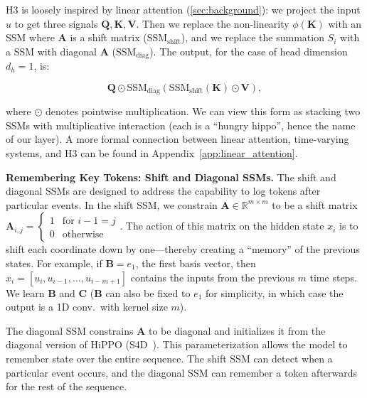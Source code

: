 \textsc{H3} is loosely inspired by linear attention (\ref{sec:background}): we project the input $u$ to get three signals $\mathbf{Q}, \mathbf{K}, \mathbf{V}$.
Then we replace the non-linearity $\phi(\mathbf{K})$ with an SSM where $\mathbf{A}$ is a shift matrix ($\mathrm{SSM}_\mathrm{shift}$), and we replace the summation $S_i$ with a SSM with diagonal $\mathbf{A}$ ($\mathrm{SSM}_\mathrm{diag}$).
The output, for the case of head dimension $d_h = 1$, is:

\begin{equation*}
  \mathbf{Q} \odot \mathrm{SSM}_\mathrm{diag}(\mathrm{SSM}_\mathrm{shift}(\mathbf{K}) \odot \mathbf{V}),
\end{equation*}

where $\odot$ denotes pointwise multiplication. We can view this form as stacking two SSMs with multiplicative interaction (each is a ``hungry hippo'', hence the name of our layer). A more formal connection between linear attention, time-varying systems, and \textsc{H3} can be found in Appendix~\ref{app:linear_attention}.

\textbf{Remembering Key Tokens: Shift and Diagonal SSMs.} The shift and diagonal SSMs are designed to address the capability to log tokens after particular events. In the shift SSM, we constrain $\mathbf{A} \in \mathbb{R}^{m \times m}$ to be a shift matrix $
\mathbf{A}_{i, j} =

\begin{cases}
    1 & \text{for } i - 1 = j\\ 0 & \text{otherwise}
    \end{cases}

$. The action of this matrix on the hidden state $x_i$ is to shift each coordinate down by one---thereby creating a ``memory'' of the previous states. For example, if $\mathbf{B} = e_1$, the first basis vector, then $x_i = [u_i, u_{i-1}, \dots, u_{i-m+1}]$ contains the inputs from the previous $m$ time steps. We learn $\mathbf{B}$ and $\mathbf{C}$ ($\mathbf{B}$ can also be fixed to $e_1$ for simplicity, in which case the output is a 1D conv.\ with kernel size $m$).

The diagonal SSM constrains $\mathbf{A}$ to be diagonal and initializes it from the diagonal version of HiPPO (S4D~\citep{gu2022parameterization}). This parameterization allows the model to remember state over the entire sequence. The shift SSM can detect when a particular event occurs, and the diagonal SSM can remember a token afterwards for the rest of the sequence.

